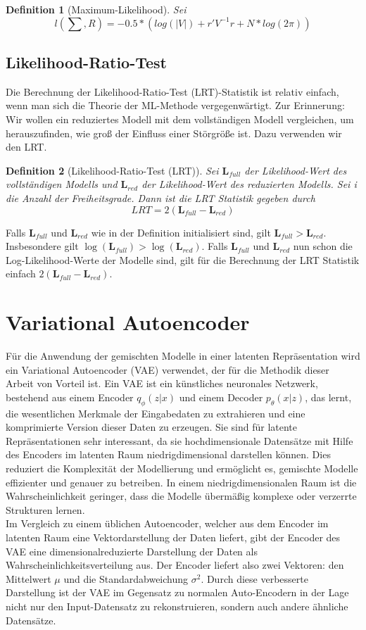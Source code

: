 \documentclass[%
thesis=student,%
coverpage=false,%
titlepage=false,%
headmarks=true, %
german,%
font=libertine, %
math=newpxtx, %
BCOR=5mm,%
coverBCOR=11mm%
]{tumbook}
\theoremstyle{break}
\newtheorem{definition}{Definition}[section]
\begin{document}
\begin{definition}[Maximum-Likelihood]
	Sei 
	$$ l(\sum,R) = -0.5 * (log(|V|)+ r'V^{-1}r + N * log(2\pi))$$
\end{definition}\noindent
\subsection{Likelihood-Ratio-Test}
Die Berechnung der Likelihood-Ratio-Test (LRT)-Statistik ist relativ einfach, wenn man sich die Theorie der ML-Methode vergegenwärtigt. Zur Erinnerung: Wir wollen ein reduziertes Modell mit dem vollständigen Modell vergleichen, um herauszufinden, wie groß der Einfluss einer Störgröße ist. Dazu verwenden wir den LRT. 
\begin{definition}[Likelihood-Ratio-Test (LRT)] 
	Sei $\mathbf{L}_{full}$ der Likelihood-Wert des vollständigen Modells und $\mathbf{L}_{red}$ der Likelihood-Wert des reduzierten Modells. Sei i die Anzahl der Freiheitsgrade. Dann ist die LRT Statistik gegeben durch 
	$$ LRT = 2(\mathbf{L}_{full}- \mathbf{L}_{red}) $$ 
\end{definition} \noindent
Falls $\mathbf{L}_{full}$ und $\mathbf{L}_{red}$ wie in der Definition initialisiert sind, gilt $\mathbf{L}_{full} > \mathbf{L}_{red}$. Insbesondere gilt $\log(\mathbf{L}_{full}) > \log(\mathbf{L}_{red})$.
Falls $\mathbf{L}_{full}$ und $\mathbf{L}_{red}$ nun schon die Log-Likelihood-Werte der Modelle sind, gilt für die Berechnung der LRT Statistik einfach $2(\mathbf{L}_{full} - \mathbf{L}_{red})$. \\
\section{Variational Autoencoder}
Für die Anwendung der gemischten Modelle in einer latenten Repräsentation wird ein Variational Autoencoder (VAE) verwendet, der für die Methodik dieser Arbeit von Vorteil ist. 
Ein VAE ist ein künstliches neuronales Netzwerk, bestehend aus einem Encoder $q_\phi(z|x)$ und einem Decoder $p_\theta(x|z)$, das lernt, die wesentlichen Merkmale der Eingabedaten zu extrahieren und eine komprimierte Version dieser Daten zu erzeugen. Sie sind für latente Repräsentationen sehr interessant, da sie hochdimensionale Datensätze mit Hilfe des Encoders im latenten Raum niedrigdimensional darstellen können. Dies reduziert die Komplexität der Modellierung und ermöglicht es, gemischte Modelle effizienter und genauer zu betreiben. In einem niedrigdimensionalen Raum ist die Wahrscheinlichkeit geringer, dass die Modelle übermäßig komplexe oder verzerrte Strukturen lernen.\\ 
Im Vergleich zu einem üblichen Autoencoder, welcher aus dem Encoder im latenten Raum eine Vektordarstellung der Daten liefert, gibt der Encoder des VAE eine dimensionalreduzierte Darstellung der Daten als Wahrscheinlichkeitsverteilung aus. Der Encoder liefert also zwei Vektoren: den Mittelwert $\mu$ und die Standardabweichung $\sigma^2$. Durch diese verbesserte Darstellung ist der VAE im Gegensatz zu normalen Auto-Encodern in der Lage nicht nur den Input-Datensatz zu rekonstruieren, sondern auch andere ähnliche Datensätze.\\
\\
\end{document}
